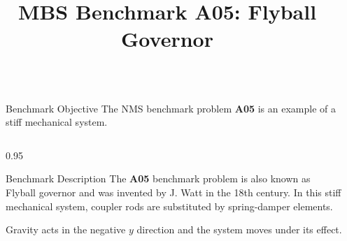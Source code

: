 \documentclass[final]{beamer}
\title{MBS Benchmark A05: Flyball Governor} %
\newlength{\sepwid}
\newlength{\onecolwid}
\newlength{\twocolwid}
\begin{document}

\setlength{\belowcaptionskip}{2ex} %
\setlength\belowdisplayshortskip{2ex} %

\begin{frame}[t] %

\begin{columns}[t] %

\begin{column}{\sepwid}\end{column} %

\begin{column}{\twocolwid} %


\begin{alertblock}{Benchmark Objective}
The NMS benchmark problem \textbf{A05} is an example of a stiff mechanical system.
\end{alertblock}




\begin{columns}[t, totalwidth=\twocolwid]

\begin{column}{0.95\onecolwid}
\begin{block}{Benchmark Description}
The \textbf{A05} benchmark problem is also known as Flyball governor and was invented by J. Watt in the 18th century. In this stiff mechanical system, coupler rods are substituted by spring-damper elements.

Gravity acts in the negative $y$ direction and the system moves under its effect.


\end{block}
\end{column}
\end{columns}
\end{column}
\end{columns}
\end{frame}
\end{document}
